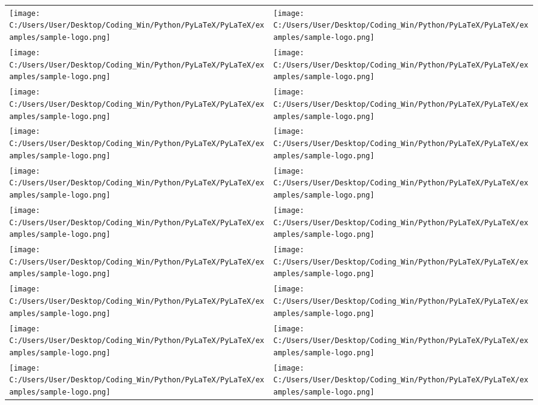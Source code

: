 \documentclass{article}%
\begin{document}
\begin{longtabu}{X[c] X[c]}%
\texttt{[image: C:/Users/User/Desktop/Coding\_Win/Python/PyLaTeX/PyLaTeX/examples/sample-logo.png]}&\texttt{[image: C:/Users/User/Desktop/Coding\_Win/Python/PyLaTeX/PyLaTeX/examples/sample-logo.png]}\\%
\texttt{[image: C:/Users/User/Desktop/Coding\_Win/Python/PyLaTeX/PyLaTeX/examples/sample-logo.png]}&\texttt{[image: C:/Users/User/Desktop/Coding\_Win/Python/PyLaTeX/PyLaTeX/examples/sample-logo.png]}\\%
\texttt{[image: C:/Users/User/Desktop/Coding\_Win/Python/PyLaTeX/PyLaTeX/examples/sample-logo.png]}&\texttt{[image: C:/Users/User/Desktop/Coding\_Win/Python/PyLaTeX/PyLaTeX/examples/sample-logo.png]}\\%
\texttt{[image: C:/Users/User/Desktop/Coding\_Win/Python/PyLaTeX/PyLaTeX/examples/sample-logo.png]}&\texttt{[image: C:/Users/User/Desktop/Coding\_Win/Python/PyLaTeX/PyLaTeX/examples/sample-logo.png]}\\%
\texttt{[image: C:/Users/User/Desktop/Coding\_Win/Python/PyLaTeX/PyLaTeX/examples/sample-logo.png]}&\texttt{[image: C:/Users/User/Desktop/Coding\_Win/Python/PyLaTeX/PyLaTeX/examples/sample-logo.png]}\\%
\texttt{[image: C:/Users/User/Desktop/Coding\_Win/Python/PyLaTeX/PyLaTeX/examples/sample-logo.png]}&\texttt{[image: C:/Users/User/Desktop/Coding\_Win/Python/PyLaTeX/PyLaTeX/examples/sample-logo.png]}\\%
\texttt{[image: C:/Users/User/Desktop/Coding\_Win/Python/PyLaTeX/PyLaTeX/examples/sample-logo.png]}&\texttt{[image: C:/Users/User/Desktop/Coding\_Win/Python/PyLaTeX/PyLaTeX/examples/sample-logo.png]}\\%
\texttt{[image: C:/Users/User/Desktop/Coding\_Win/Python/PyLaTeX/PyLaTeX/examples/sample-logo.png]}&\texttt{[image: C:/Users/User/Desktop/Coding\_Win/Python/PyLaTeX/PyLaTeX/examples/sample-logo.png]}\\%
\texttt{[image: C:/Users/User/Desktop/Coding\_Win/Python/PyLaTeX/PyLaTeX/examples/sample-logo.png]}&\texttt{[image: C:/Users/User/Desktop/Coding\_Win/Python/PyLaTeX/PyLaTeX/examples/sample-logo.png]}\\%
\texttt{[image: C:/Users/User/Desktop/Coding\_Win/Python/PyLaTeX/PyLaTeX/examples/sample-logo.png]}&\texttt{[image: C:/Users/User/Desktop/Coding\_Win/Python/PyLaTeX/PyLaTeX/examples/sample-logo.png]}\\%

\end{longtabu}
\end{document}
